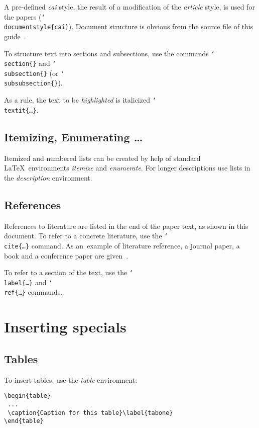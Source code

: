 \documentclass{cai}
\def\bs#1{{\tt\char`\\#1}}
\begin{document}
A pre-defined \textit{cai} style, the result of a modification of the \textit{article} style, is used for the
papers (\bs{documentstyle\{cai\}}). Document structure is obvious from the source file of this
guide~\cite{cai-style}.

To structure text into sections and subsections, use the commands \bs{section\{\}} and \bs{subsection\{\}}
(or \bs{subsubsection\{\}}).

As a rule, the text to be \textit{highlighted} is italicized \bs{textit\{\dots\}}.


\subsection{Itemizing, Enumerating \dots}

Itemized and numbered lists can be created by help of standard \LaTeX\ environments \textit{itemize} and
\textit{enumerate}. For longer descriptions use lists in the \textit{description} environment.


\subsection{References}

References to literature are listed in the end of the paper text, as shown in this document. To refer to a
concrete literature, use the \bs{cite\{\dots\}} command. As an~example of literature reference, a journal
paper, a book and a conference paper are given~\cite{aklbruda, hintikka, marektruszczinski}.

To refer to a section of the text, use the \bs{label\{\dots\}} and \bs{ref\{\dots\}} commands.

\section{Inserting specials}

\subsection{Tables}

To insert tables, use the \textit{table} environment:

\begin{verbatim}
\begin{table}
 ...
 \caption{Caption for this table}\label{tabone}
\end{table}
\end{verbatim}
\end{document}
